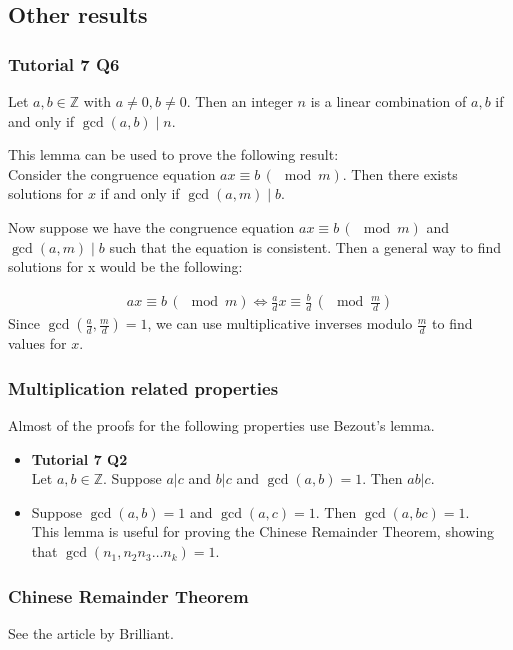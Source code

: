 \documentclass{article}
\begin{document}
\subsection{Other results}

\subsubsection{Tutorial 7 Q6}
Let $a,b\in \mathbb{Z}$ with $a\neq 0,b\neq 0$. Then an integer $n$ is a linear combination of $a,b$ if and only if $\gcd(a,b)\mid n$.

This lemma can be used to prove the following result:\\
Consider the congruence equation $ax\equiv b\,(\mod m)$. Then there exists solutions for $x$ if and only if $\gcd(a,m)\mid b$.

Now suppose we have the congruence equation $ax\equiv b\,(\mod m)$ and $\gcd(a,m)\mid b$ such that the equation is consistent. Then a general way to find solutions for x would be the following:

\begin{align*}
    ax\equiv b\,(\mod m) \iff \frac{a}{d}x\equiv \frac{b}{d}\, (\mod \frac{m}{d})
\end{align*}
Since $\gcd(\frac{a}{d},\frac{m}{d})=1$, we can use multiplicative inverses modulo $\frac{m}{d}$ to find values for $x$.


\subsubsection{Multiplication related properties}
Almost of the proofs for the following properties use Bezout's lemma.
\begin{itemize}
	\item \textbf{Tutorial 7 Q2}\\
	Let $a,b\in \mathbb{Z}$. Suppose $a|c$ and $b|c$ and $\gcd(a,b)=1$. Then $ab|c$.
	\item 
	Suppose $\gcd(a,b)=1$ and $\gcd(a,c)=1$. Then $\gcd(a,bc)=1$.\\
	This lemma is useful for proving the Chinese Remainder Theorem, showing that $\gcd(n_1, n_2n_3\dots n_k)=1$.
\end{itemize}

\subsubsection{Chinese Remainder Theorem}
See the article by Brilliant.
\end{document}
